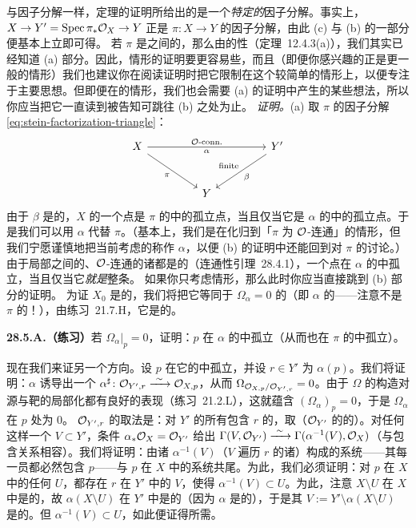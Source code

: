 与\trStein{}因子分解一样，定理的证明所给出的是一个\emph{特定的}因子分解。事实上，$X\to Y'=\operatorname{Spec}\pi_*\mathcal{O}_X\to Y$ 正是 $\pi\colon X\to Y$ 的\trStein{}因子分解，由此 (c) 与 (b) 的一部分便基本上立即可得。
若 $\pi$ 是\emph{\trVariety}之间的\trMorphism，那么由\trFiber\trDimension{}的\trUpperSemicontinuous{}性（\mbox{定理~12.4.3(a)}），我们其实已经知道 (a) 部分。因此，\trVariety{}情形的证明要更容易些，而且（即便你感兴趣的正是更一般的情形）我们也建议你在阅读证明时把它限制在这个较简单的情形上，以便专注于主要思想。但即便在\trVariety{}的情形，我们也会需要 (a) 的证明中产生的某些想法，所以你应当把它一直读到被告知可跳往 (b) 之处为止。
\emph{证明。}\quad (a) 取 $\pi$ 的\trStein{}因子分解 \eqref{eq:stein-factorization-triangle}：
\[
\begin{tikzcd}[row sep=2.8em, column sep=4.5em]
X \ar[rr, "\text{$\OO$-conn.}", "\alpha"'] \ar[dr, "\pi"'] && Y' \ar[dl, "\beta", "\text{finite}"'] \\
& Y &
\end{tikzcd}
\]
由于 $\beta$ 是\trFinite{}的，$X$ 的一个点是 $\pi$ 的\trFiber{}中的孤立点，当且仅当它是 $\alpha$ 的\trFiber{}中的孤立点。于是我们可以用 $\alpha$ 代替 $\pi$。（基本上，我们是在化归到「$\pi$ 为 $\mathcal{O}$-连通」的情形，但我们宁愿谨慎地把当前考虑的\trMorphism{}称作 $\alpha$，以便 (b) 的证明中还能回到对 $\pi$ 的讨论。）
由于局部\trNoether{}\trScheme{}之间的\trProper{}、$\mathcal{O}$-连通\trMorphism{}的诸\trFiber{}都是\trConnected{}的（\mbox{\trZariski{}连通性引理~28.4.1}），一个点在 $\alpha$ 的\trFiber{}中孤立，当且仅当它\emph{就是}整条\trFiber。
如果你只考虑\trVariety{}情形，那么此时你应当直接跳到 (b) 部分的证明。
为证 $X_0$ 是\trOpen{}的，我们将把它等同于 $\Omega_\alpha=0$ 的\trLocus（即 $\alpha$ 的\trUnramified\trLocus——注意不是 $\pi$ 的！），由\mbox{练习~21.7.H}，它是\trOpen{}的。

\textbf{28.5.A.（练习）}\quad 若 $\Omega_\alpha|_p=0$，证明：$p$ 在 $\alpha$ 的\trFiber{}中孤立（从而也在 $\pi$ 的\trFiber{}中孤立）。

现在我们来证另一个方向。设 $p$ 在它的\trFiber{}中孤立，并设 $r\in Y'$ 为 $\alpha(p)$。我们将证明：$\alpha$ 诱导出一个\trIsomorphism{} $\alpha^{\sharp}\colon\OO_{Y',r}\xrightarrow{\ \sim\ }\OO_{X,p}$，从而 $\Omega_{\mathcal{O}_{X,p}/\mathcal{O}_{Y',r}}=0$。由于 $\Omega$ 的构造对源与靶的局部化都有良好的表现（\mbox{练习~21.2.L}），这就蕴含 $(\Omega_\alpha)_p=0$，于是 $\Omega_\alpha$ 在 $p$ 处为 $0$。
\trStalk{} $\mathcal{O}_{Y',r}$ 的取法是：对 $Y'$ 的所有包含 $r$ 的\trOpenSubset，取（$\mathcal{O}_{Y'}$ 的\trSection{}的）\trColimit。对任何这样一个\trOpenSubset{} $V\subset Y'$，条件 $\alpha_*\mathcal{O}_X=\mathcal{O}_{Y'}$ 给出\trIsomorphism{} $\Gamma(V,\OO_{Y'})\xrightarrow{\ \sim\ }\Gamma(\alpha^{-1}(V),\OO_X)$（与包含关系相容）。我们将证明：由诸 $\alpha^{-1}(V)$（$V$ 遍历 $r$ 的诸\trOpen\trNeighborhood）构成的系统——其每一员都必然包含 $p$——与 $p$ 在 $X$ 中的\trOpen\trNeighborhood{}系统共尾。为此，我们必须证明：对 $p$ 在 $X$ 中的任何\trOpen\trNeighborhood{} $U$，都存在 $r$ 在 $Y'$ 中的\trOpen\trNeighborhood{} $V$，使得 $\alpha^{-1}(V)\subset U$。为此，注意 $X\setminus U$ 在 $X$ 中是\trClosed{}的，故 $\alpha(X\setminus U)$ 在 $Y'$ 中是\trClosed{}的（因为 $\alpha$ 是\trProper{}的），于是其\trComplement{} $V:=Y'\setminus\alpha(X\setminus U)$ 是\trOpen{}的。但 $\alpha^{-1}(V)\subset U$，如此便证得所需。

